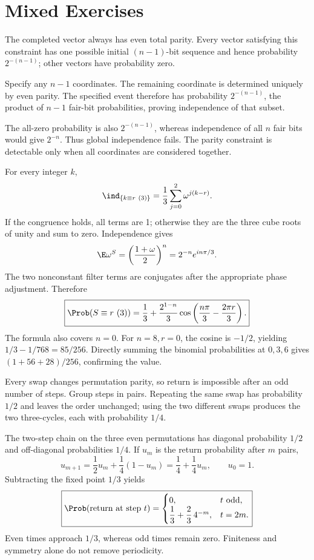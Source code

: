 \section{Mixed Exercises}

The completed vector always has even total parity. Every vector satisfying this constraint has one possible initial $(n-1)$-bit sequence and hence probability $2^{-(n-1)}$; other vectors have probability zero.

Specify any $n-1$ coordinates. The remaining coordinate is determined uniquely by even parity. The specified event therefore has probability $2^{-(n-1)}$, the product of $n-1$ fair-bit probabilities, proving independence of that subset.

The all-zero probability is also $2^{-(n-1)}$, whereas independence of all $n$ fair bits would give $2^{-n}$. Thus global independence fails. The parity constraint is detectable only when all coordinates are considered together.

For every integer $k$,
\[
\ind_{\{k\equiv r\ (3)\}}
=\frac13\sum_{j=0}^2\omega^{j(k-r)}.
\]
If the congruence holds, all terms are 1; otherwise they are the three cube roots of unity and sum to zero. Independence gives
\[
\E\omega^S=\left(\frac{1+\omega}{2}\right)^n
=2^{-n}e^{in\pi/3}.
\]
The two nonconstant filter terms are conjugates after the appropriate phase adjustment. Therefore
\[
\boxed{\Prob(S\equiv r\ (3))
=\frac13+\frac{2^{1-n}}3
\cos\left(\frac{n\pi}{3}-\frac{2\pi r}{3}\right).}
\]
The formula also covers $n=0$. For $n=8,r=0$, the cosine is $-1/2$, yielding $1/3-1/768=85/256$. Directly summing the binomial probabilities at $0,3,6$ gives $(1+56+28)/256$, confirming the value.

Every swap changes permutation parity, so return is impossible after an odd number of steps. Group steps in pairs. Repeating the same swap has probability $1/2$ and leaves the order unchanged; using the two different swaps produces the two three-cycles, each with probability $1/4$.

The two-step chain on the three even permutations has diagonal probability $1/2$ and off-diagonal probabilities $1/4$. If $u_m$ is the return probability after $m$ pairs,
\[
u_{m+1}=\frac12u_m+\frac14(1-u_m)
=\frac14+\frac14u_m,\qquad u_0=1.
\]
Subtracting the fixed point $1/3$ yields
\[
\boxed{\Prob(\text{return at step }t)=
\begin{cases}
0,&t\text{ odd},\\
\dfrac13+\dfrac23\,4^{-m},&t=2m.
\end{cases}}
\]
Even times approach $1/3$, whereas odd times remain zero. Finiteness and symmetry alone do not remove periodicity.

